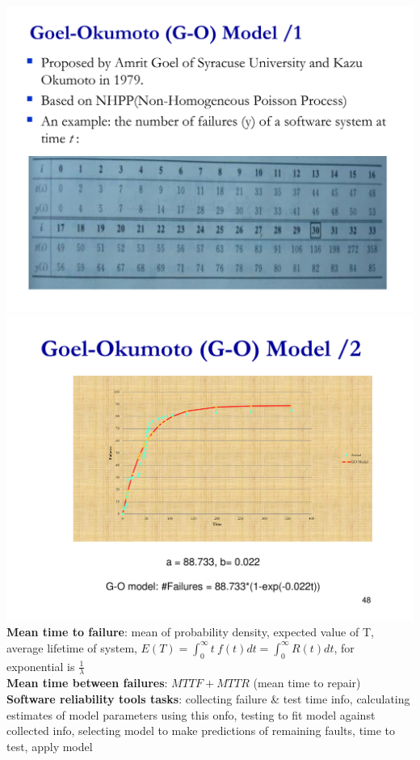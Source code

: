 \documentclass[a4paper]{article}
\begin{document}
\begin{multicols}{3}
        \includegraphics[width=\linewidth]{391.pdf}\\
        \includegraphics[width=\linewidth]{392.pdf}\\
        \textbf{Mean time to failure}: mean of probability density, expected value of T, average lifetime of system, $E(T) = \int_0^\infty t \: f(t)dt = \int_0^\infty R(t)dt$, for exponential is $\frac{1}{\lambda}$\\
        \textbf{Mean time between failures}: $MTTF + MTTR$ (mean time to repair)\\
        \textbf{Software reliability tools tasks}: collecting failure \& test time info, calculating estimates of model parameters using this onfo, testing to fit model against collected info, selecting model to make predictions of remaining faults, time to test, apply model\\

\end{multicols}
\end{document}
